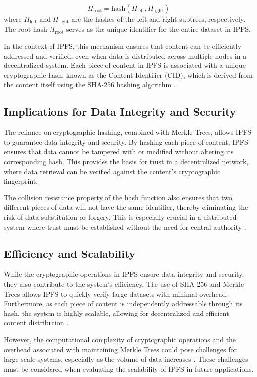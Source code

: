 \documentclass[final]{rc-book-2.14}
\begin{document}
\[
    H_{\text{root}} = \text{hash}(H_{\text{left}}, H_{\text{right}})
\]
where $H_{\text{left}}$ and $H_{\text{right}}$ are the hashes of the left and right subtrees, respectively. The root hash $H_{\text{root}}$ serves as the unique identifier for the entire dataset in IPFS.

In the context of IPFS, this mechanism ensures that content can be efficiently addressed and verified, even when data is distributed across multiple nodes in a decentralized system. Each piece of content in IPFS is associated with a unique cryptographic hash, known as the Content Identifier (CID), which is derived from the content itself using the SHA-256 hashing algorithm \cite{ipfs2015}.

\subsection{Implications for Data Integrity and Security}

The reliance on cryptographic hashing, combined with Merkle Trees, allows IPFS to guarantee data integrity and security. By hashing each piece of content, IPFS ensures that data cannot be tampered with or modified without altering its corresponding hash. This provides the basis for trust in a decentralized network, where data retrieval can be verified against the content's cryptographic fingerprint.

The collision resistance property of the hash function also ensures that two different pieces of data will not have the same identifier, thereby eliminating the risk of data substitution or forgery. This is especially crucial in a distributed system where trust must be established without the need for central authority \cite{cachin2016blockchains}.

\subsection{Efficiency and Scalability}

While the cryptographic operations in IPFS ensure data integrity and security, they also contribute to the system's efficiency. The use of SHA-256 and Merkle Trees allows IPFS to quickly verify large datasets with minimal overhead. Furthermore, as each piece of content is independently addressable through its hash, the system is highly scalable, allowing for decentralized and efficient content distribution \cite{budiu2007designing}.

However, the computational complexity of cryptographic operations and the overhead associated with maintaining Merkle Trees could pose challenges for large-scale systems, especially as the volume of data increases \cite{tapscott2016blockchain}. These challenges must be considered when evaluating the scalability of IPFS in future applications.
\end{document}
